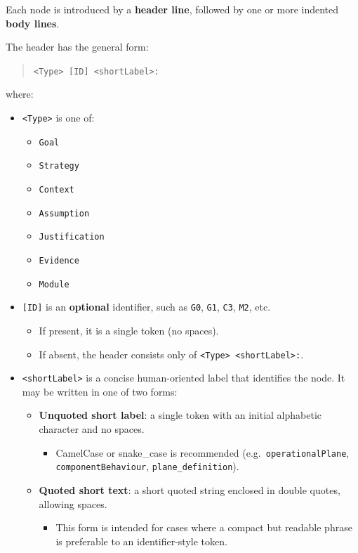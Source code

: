 \documentclass[11pt,twoside,a4paper]{article}
\begin{document}
Each node is introduced by a \textbf{header line}, followed by one or more indented \textbf{body lines}.

The header has the general form:
\begin{quote}
\texttt{\textless Type\textgreater{} [ID] \textless shortLabel\textgreater:}
\end{quote}

where:

\begin{itemize}[leftmargin=2em]
  \item \texttt{\textless Type\textgreater{}} is one of:
  \begin{itemize}[leftmargin=1.5em]
    \item \texttt{Goal}
    \item \texttt{Strategy}
    \item \texttt{Context}
    \item \texttt{Assumption}
    \item \texttt{Justification}
    \item \texttt{Evidence}
    \item \texttt{Module}
  \end{itemize}

  \item \texttt{[ID]} is an \textbf{optional} identifier, such as \texttt{G0}, \texttt{G1}, \texttt{C3}, \texttt{M2}, etc.
  \begin{itemize}[leftmargin=1.5em]
    \item If present, it is a single token (no spaces).
    \item If absent, the header consists only of \texttt{\textless Type\textgreater{} \textless shortLabel\textgreater:}.
  \end{itemize}

  \item \texttt{\textless shortLabel\textgreater{}} is a concise human-oriented label that identifies the node.
  It may be written in one of two forms:
  \begin{itemize}[leftmargin=1.5em]
    \item \textbf{Unquoted short label}: a single token with an initial alphabetic character and no spaces.
    \begin{itemize}[leftmargin=1.5em]
      \item CamelCase or snake\_case is recommended (e.g.\ \texttt{operationalPlane}, \texttt{componentBehaviour}, \texttt{plane\_definition}).
    \end{itemize}
    \item \textbf{Quoted short text}: a short quoted string enclosed in double quotes, allowing spaces.
    \begin{itemize}[leftmargin=1.5em]
      \item This form is intended for cases where a compact but readable phrase is preferable to an identifier-style token.
    \end{itemize}
  \end{itemize}


\end{itemize}
\end{document}
